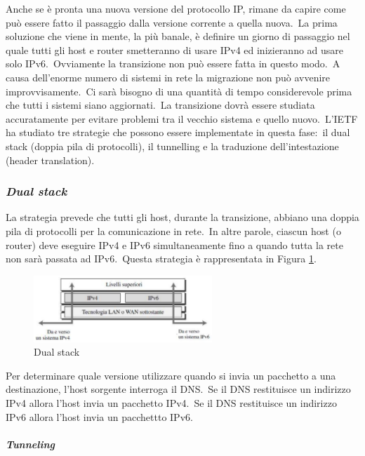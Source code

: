 Anche se è pronta una nuova versione del protocollo IP, rimane da capire come può essere fatto il passaggio dalla versione corrente a quella nuova.\
La prima soluzione che viene in mente, la più banale, è definire un giorno di passaggio nel quale tutti gli host e router smetteranno di usare IPv4 ed inizieranno ad usare solo IPv6.\
Ovviamente la transizione non può essere fatta in questo modo.\
A causa dell'enorme numero di sistemi in rete la migrazione non può avvenire improvvisamente.\
Ci sarà bisogno di una quantità di tempo considerevole prima che tutti i sistemi siano aggiornati.\
La transizione dovrà essere studiata accuratamente per evitare problemi tra il vecchio sistema e quello nuovo.\
L'IETF ha studiato tre strategie che possono essere implementate in questa fase:\ il dual stack (doppia pila di protocolli), il tunnelling e la traduzione dell'intestazione (header translation).

\subsubsection{\emph{Dual stack}}

La strategia prevede che tutti gli host, durante la transizione, abbiano una doppia pila di protocolli per la comunicazione in rete.\
In altre parole, ciascun host (o router) deve eseguire IPv4 e IPv6 simultaneamente fino a quando tutta la rete non sarà passata ad IPv6.\
Questa strategia è rappresentata in Figura \ref{fig:Dual_stack}.

\begin{figure}[H]
    \centering
    \includegraphics[width=0.6\textwidth]{immagini/Dual_stack.jpg}
    \caption{Dual stack}
    \label{fig:Dual_stack}
\end{figure}

Per determinare quale versione utilizzare quando si invia un pacchetto a una destinazione, l'host sorgente interroga il DNS.\
Se il DNS restituisce un indirizzo IPv4 allora l'host invia un pacchetto IPv4.\
Se il DNS restituisce un indirizzo IPv6 allora l'host invia un pacchettto IPv6.

\paragraph{\emph{Tunneling}}

